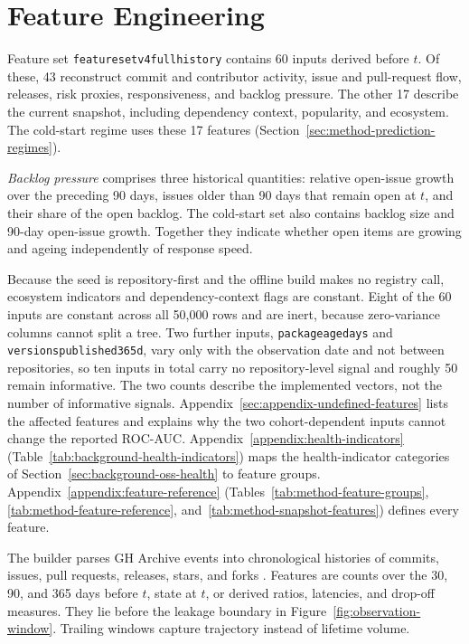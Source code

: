 \section{Feature Engineering}
\label{sec:method-feature-engineering}

Feature set \texttt{feature\sdash set\sdash v4\sdash full\sdash history} contains
60 inputs derived before \(t\). Of these, 43 reconstruct commit and contributor
activity, issue and pull-request flow, releases, risk proxies, responsiveness,
and backlog pressure. The other 17 describe the current snapshot, including
dependency context, popularity, and ecosystem. The cold-start regime uses these
17 features (Section~\ref{sec:method-prediction-regimes}).

\emph{Backlog pressure} comprises three historical quantities: relative
open-issue growth over the preceding 90 days, issues older than 90 days that
remain open at \(t\), and their share of the open backlog. The cold-start set also
contains backlog size and 90-day open-issue growth. Together they indicate
whether open items are growing and ageing independently of response speed.

Because the seed is repository-first and the offline build makes no registry
call, ecosystem indicators and dependency-context flags are constant. Eight of
the 60 inputs are constant across all 50,000 rows and are inert, because
  zero-variance columns cannot split a tree. Two further inputs,
  \texttt{package\sdash age\sdash days} and
  \texttt{versions\sdash published\sdash 365d}, vary only with the observation
  date and not between repositories, so ten inputs in total carry no
  repository-level signal and roughly 50 remain informative. The two counts describe the
  implemented vectors, not the number of informative signals. Appendix~\ref{sec:appendix-undefined-features}
lists the affected features and explains why the two cohort-dependent inputs
cannot change the reported ROC-AUC.
Appendix~\ref{appendix:health-indicators}
(Table~\ref{tab:background-health-indicators}) maps the health-indicator
categories of Section~\ref{sec:background-oss-health} to feature groups.
Appendix~\ref{appendix:feature-reference}
(Tables~\ref{tab:method-feature-groups}, \ref{tab:method-feature-reference},
and~\ref{tab:method-snapshot-features}) defines every feature.

The builder parses GH Archive events into chronological histories of commits,
issues, pull requests, releases, stars, and forks \cite{gharchive}. Features are
counts over the 30, 90, and 365 days before \(t\), state at \(t\), or derived
ratios, latencies, and drop-off measures. They lie before the leakage boundary in
Figure~\ref{fig:observation-window}. Trailing windows capture trajectory instead
of lifetime volume.

